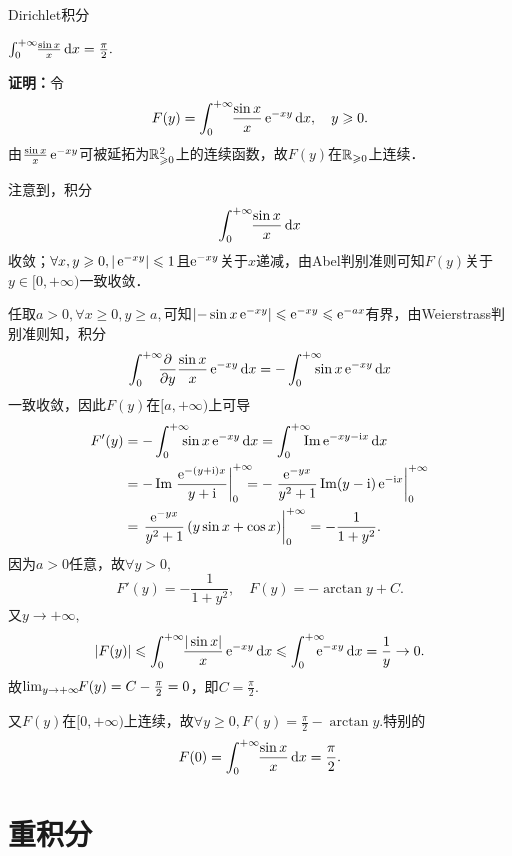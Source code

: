 \begin{example}{Dirichlet积分}{}
	\begin{center}
		$\int\zti\bs3\frac{\sin x}x\d x=\frac{\pi}2.$
	\end{center}
	\textbf{证明：}令
	\[
		F(y)=\int\zti\bs3\frac{\sin x}x\e{-xy}\d x,\quad y\geqslant 0.
	\]
	由$\frac{\sin x}x\e{-xy}$可被延拓为$\RR_{\geqslant 0}^2$上的连续函数，故$F(y)$在$\RR_{\geqslant 0}$上连续．

	注意到，积分
	\[
		\int\zti\bs3\frac{\sin x}x\d x
	\]
	收敛；$\forall x,y\geqslant 0,|\e{-xy}|\leqslant 1$且$\e{-xy}$关于$x$递减，由Abel判别准则可知$F(y)$关于$y\in[0,+\infty)$一致收敛．

	任取$a>0,\forall x\geqslant 0,y\geqslant a,$可知$\left|-\sin x\e{-xy}\right|\leqslant \e{-xy}\leqslant \e{-ax}$有界，由Weierstrass判别准则知，积分
	\[
		\int\zti\bs5\pv {}y\frac{\sin x}x\e{-xy}\d x=-\int\zti\bs7\sin x\e{-xy}\d x
	\]
	一致收敛，因此$F(y)$在$[a,+\infty)$上可导
	\begin{align*}
		F'(y) & =-\int\zti\bs7\sin x\e{-xy}\d x=\int\zti\bs7\Im\e{-xy-\i x}\d x                                                \\
			  & =-\Im\left.\frac{\e{-(y+\i)x}}{y+\i}\right|\zti\bs7=-\left.\frac{\e{-yx}}{y^2+1}\Im(y-\i)\e{-\i x}\right|\zti \\
			  & =\left.\frac{\e{-yx}}{y^2+1}\left(y\sin x+\cos x\right)\right|\zti=-\frac1{1+y^2}.
	\end{align*}
	因为$a>0$任意，故$\forall y>0,$
	\[
		F'(y)=-\frac1{1+y^2},\quad F(y)=-\arctan y+C.
	\]
	又$y\to+\infty,$
	\[
		|F(y)|\leqslant\int\zti\bs3\frac{|\sin x|}x\e{-xy}\d x\leqslant\int\zti\bs8\e{-xy}\d x=\frac1y\to0.
	\]
	故$\lim_{y\to+\infty}\bs3F(y)=C-\frac{\pi}2=0$，即$C=\frac{\pi}2.$

	又$F(y)$在$[0,+\infty)$上连续，故$\forall y\geqslant 0,F(y)=\frac{\pi}2-\arctan y.$特别的
	\[
		F(0)=\int\zti\bs3\frac{\sin x}x\d x=\frac{\pi}2.
	\]
\end{example}
\newpage
\section{重积分}
